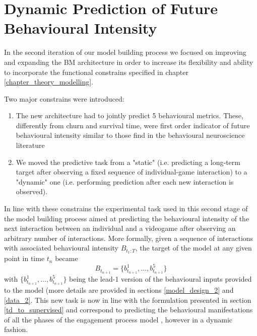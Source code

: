 \section{Dynamic Prediction of Future Behavioural Intensity}
\label{model_architecture_2}
In the second iteration of our model building process we focused on improving and expanding the BM architecture in order to increase its flexibility and ability to incorporate the functional constrains specified in chapter \ref{chapter_theory_modelling}. 

Two major constrains were introduced:
\begin{enumerate}
    \item The new architecture had to jointly predict 5 behavioural metrics. These, differently from churn and survival time, were first order indicator of future behavioural intensity similar to those find in the behavioural neuroscience literature \cite{schultz1997neural,mcclure2003computational,berridge2004motivation,zhang2009neural}
    
    \item We moved the predictive task from a "static" (i.e. predicting a long-term target after observing a fixed sequence of individual-game interaction) to a "dynamic" one (i.e. performing prediction after each new interaction is observed).
\end{enumerate}

In line with these constrains the experimental task used in this second stage of the model building process aimed at predicting the behavioural intensity of the next interaction between an individual and a videogame after observing an arbitrary number of interactions. More formally, given a sequence of interactions with associated behavioural intensity $B_{t_1 : T}$, the target of the model at any given point in time $t_n$ became
\begin{equation}
\label{joint_target_eq}
   B_{t_{n+1}} = \{b^1_{t_{n+1}}, \dots,  b^5_{t_{n+1}}\}
\end{equation}
with $\{b^1_{t_{n+1}}, \dots, b^5_{t_{n+1}}\}$ being the lead-1 version of the behavioural inputs provided to the model (more details are provided in sections \ref{model_design_2} and \ref{data_2}. This new task is now in line with the formulation presented in section \ref{td_to_supervised} and correspond to predicting the behavioural manifestations of all the phases of the engagement process model \cite{o2008user}, however in a dynamic fashion. 

